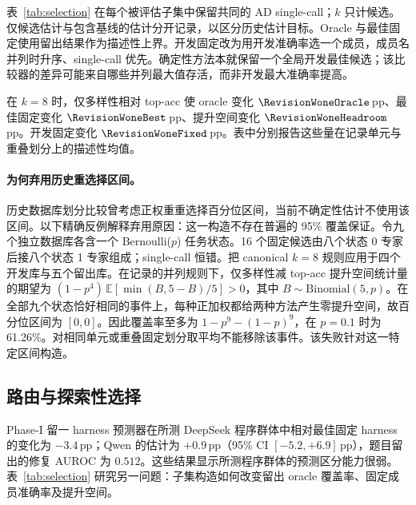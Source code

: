表~\ref{tab:selection} 在每个被评估子集中保留共同的 AD single-call；$k$ 只计候选。仅候选估计与包含基线的估计分开记录，以区分历史估计目标。Oracle 与最佳固定使用留出结果作为描述性上界。开发固定改为用开发准确率选一个成员，成员名并列时升序、single-call 优先。确定性方法本就保留一个全局开发最佳候选；该比较器的差异可能来自哪些并列最大值存活，而非开发最大准确率提高。

在 $k=8$ 时，仅多样性相对 top-acc 使 oracle 变化 $\RevisionWoneOracle$\,pp、最佳固定变化 $\RevisionWoneBest$\,pp、提升空间变化 $\RevisionWoneHeadroom$\,pp。开发固定变化 $\RevisionWoneFixed$\,pp。表中分别报告这些量在记录单元与重叠划分上的描述性均值。

\begin{table}[H]
\centering\small

\caption{历史 BIRD 子集选择重分析。每个池含 $k$ 个选定候选加共同 single-call。18 单元与 100 个重叠数据库划分上的均值。开发固定仅在开发数据上选择；最佳固定使用留出结果。}
\label{tab:selection}
\end{table}

\paragraph{为何弃用历史重选择区间。}
历史数据库划分比较曾考虑正权重重选择百分位区间，当前不确定性估计不使用该区间。以下精确反例解释弃用原因：这一构造不存在普遍的 95\% 覆盖保证。令九个独立数据库各含一个 Bernoulli($p$) 任务状态。16 个固定候选由八个状态 0 专家后接八个状态 1 专家组成；single-call 恒错。把 canonical $k=8$ 规则应用于四个开发库与五个留出库。在记录的并列规则下，仅多样性减 top-acc 提升空间统计量的期望为 $(1-p^4)\,\mathbb{E}[\min(B,5-B)/5]>0$，其中 $B\sim\mathrm{Binomial}(5,p)$。在全部九个状态恰好相同的事件上，每种正加权都给两种方法产生零提升空间，故百分位区间为 $[0,0]$。因此覆盖率至多为 $1-p^9-(1-p)^9$，在 $p=0.1$ 时为 61.26\%。对相同单元或重叠固定划分取平均不能移除该事件。该失败针对这一特定区间构造。

\subsection{路由与探索性选择}\label{sec:boundary}
Phase-I 留一 harness 预测器在所测 DeepSeek 程序群体中相对最佳固定 harness 的变化为 $-3.4$\,pp；Qwen 的估计为 $+0.9$\,pp（95\% CI $[-5.2,+6.9]$\,pp），题目留出的修复 AUROC 为 $0.512$。这些结果显示所测程序群体的预测区分能力很弱。表~\ref{tab:selection} 研究另一问题：子集构造如何改变留出 oracle 覆盖率、固定成员准确率及提升空间。

\FloatBarrier
